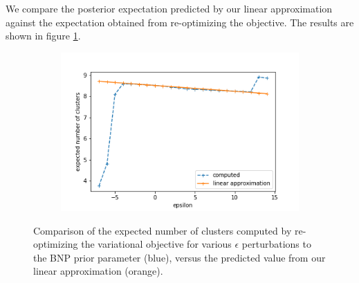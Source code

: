 \documentclass[a4paper]{article}
\begin{document}

We compare the posterior expectation predicted by our linear approximation against the
expectation obtained from re-optimizing the objective. The results are shown in figure
\ref{fig:parametric_sens_e_num_clusters}.

\begin{figure}[h!]
	\centering
	\begin{subfigure}[t]{0.4\textwidth}
		\includegraphics[width = \textwidth]{./parametric_sens_results/pred_num_clusters.png}
	\end{subfigure}
	\caption{Comparison of the expected number of clusters computed by re-optimizing
  the variational objective for various $\epsilon$ perturbations to the BNP prior parameter
  (blue),
  versus the predicted value from our linear approximation (orange). }
	\label{fig:parametric_sens_e_num_clusters}
\end{figure}
\end{document}
